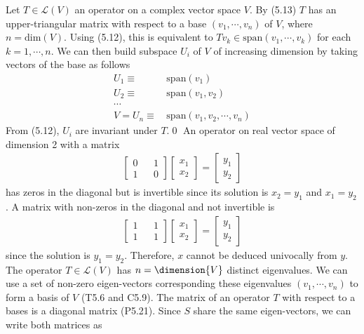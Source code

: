 \exo{} Let $T\in\mathcal{L}(V)$ an operator on a complex vector space $V$. By (5.13) $T$ has an upper-triangular matrix with respect to a base $(v_1, \cdots,v_n)$ of $V$, where $n=\mathrm{dim}(V)$. Using (5.12), this is equivalent to $Tv_k\in\mathrm{span}(v_1,\cdots,v_k)$ for each $k=1,\cdots,n$. We can then build  subspace $U_i$ of $V$ of increasing dimension by taking vectors of the base as follows
\begin{align*}
U_1 \equiv &\,\mathrm{span}(v_1) \\
U_2 \equiv &\,\mathrm{span}(v_1,v_2) \\
\cdots\\
V = U_n \equiv &\,\mathrm{span}(v_1,v_2,\cdots,v_n)
\end{align*}
From (5.12), $U_i$ are invariant under $T$.\qed
\exo{} An operator on real vector space of dimension 2 with a matrix
\begin{align*}
\begin{bmatrix}
0 && 1 \\
1 && 0
\end{bmatrix}\begin{bmatrix}
x_1 \\ x_2
\end{bmatrix} =
\begin{bmatrix}
y_1 \\ y_2
\end{bmatrix} 
\end{align*}
has zeros in the diagonal but is invertible since its solution is
$x_2 = y_1$ and $x_1 = y_2$.
\exo{} A matrix with non-zeros in the diagonal and not invertible is
\begin{align*}
\begin{bmatrix}
1 && 1 \\
1 && 1
\end{bmatrix}\begin{bmatrix}
x_1 \\ x_2
\end{bmatrix} =
\begin{bmatrix}
y_1 \\ y_2
\end{bmatrix} 
\end{align*}
since the solution is $y_1=y_2$. Therefore, $x$ cannot be deduced univocally from $y$.
\exo{} The operator $T\in\mathcal{L}(V)$ has $n=\dimension{V}$ distinct eigenvalues. We can use a set of non-zero eigen-vectors corresponding these eigenvalues $(v_1,\cdots, v_n)$ to form a basis of $V$ (T5.6 and C5.9).  The matrix of an operator $T$ with respect to a bases is a diagonal matrix (P5.21). Since $S$ share the same eigen-vectors, we can write both matrices as
